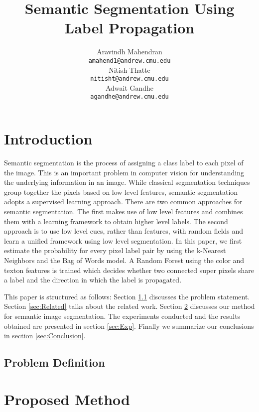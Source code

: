 \documentclass{article} %
\title{Semantic Segmentation Using Label Propagation}
\author{
Aravindh Mahendran \\
\texttt{amahend1@andrew.cmu.edu} \\ 
\And
Nitish Thatte \\
\texttt{nitisht@andrew.cmu.edu} \\
\AND
Adwait Gandhe \\
\texttt{agandhe@andrew.cmu.edu} \\
}
\begin{document}
\maketitle

\begin{abstract}

\end{abstract}


\section{Introduction}
Semantic segmentation is the process of assigning a class label to each pixel of the image. This is an important problem in computer vision for understanding the underlying information in an image. While classical segmentation techniques group together the pixels based on low level features, semantic segmentation adopts a supervised learning approach. There are two common approaches for semantic segmentation. The first makes use of low level features and combines them with a learning framework to obtain higher level labels. The second approach is to use low level cues, rather than features, with random fields and learn a unified framework using low level segmentation. In this paper, we first estimate the probability for every pixel label pair by using the k-Nearest Neighbors and the Bag of Words model. A Random Forest \cite{Statistics01randomforests} using the color and texton features is trained which decides whether two connected super pixels share a label and the direction in which the label is propagated. 

This paper is structured as follows: Section \ref{sec:Problem} discusses the problem statement. Section \ref{sec:Related} talks about the related work. Section \ref{sec:Proposed} discusses our method for semantic image segmentation. The experiments conducted and the results obtained are presented in section \ref{sec:Exp}. Finally we summarize our conclusions in section \ref{sec:Conclusion}.
\label{sec:Intro}


\subsection{Problem Definition}
\label{sec:Problem}

\section{Proposed Method}
\label{sec:Proposed}
\end{document}
